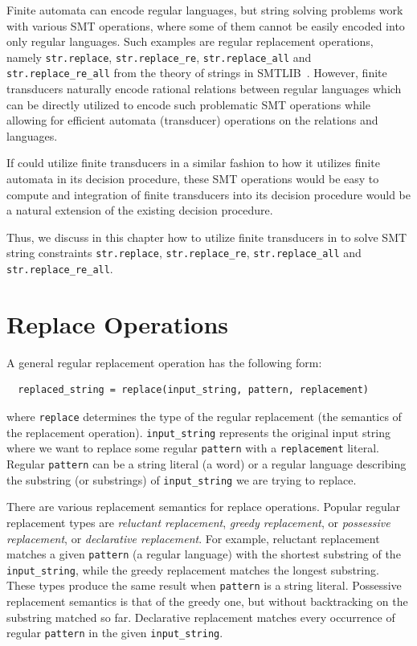 Finite automata can encode regular languages, but string solving problems work with various SMT operations, where some of them cannot be easily encoded into only regular languages.
Such examples are regular replacement operations, namely \texttt{str.replace}, \texttt{str.replace\_re}, \texttt{str.replace\_all} and \texttt{str.replace\_re\_all} from the theory of strings in SMTLIB~\cite{smtlib_theory_strings}.
However, finite transducers naturally encode rational relations between regular languages which can be directly utilized to encode such problematic SMT operations while allowing for efficient automata (transducer) operations on the relations and languages.

If \noodler could utilize finite transducers in a similar fashion to how it utilizes finite automata in its decision procedure, these SMT operations would be easy to compute and integration of finite transducers into its decision procedure would be a natural extension of the existing decision procedure.

Thus, we discuss in this chapter how to utilize finite transducers in \noodler to solve SMT string constraints \texttt{str.replace}, \texttt{str.replace\_re}, \texttt{str.replace\_all} and \texttt{str.replace\_re\_all}.

\section{Replace Operations}
A general regular replacement operation has the following form:
\begin{center}
\begin{verbatim}
  replaced_string = replace(input_string, pattern, replacement)
\end{verbatim}
\end{center}
where \texttt{replace} determines the type of the regular replacement (the semantics of the replacement operation).
\texttt{input\_string} represents the original input string where we want to replace some regular \texttt{pattern} with a \texttt{replacement} literal.
Regular \texttt{pattern} can be a string literal (a word) or a regular language describing the substring (or substrings) of \texttt{input\_string} we are trying to replace.

There are various replacement semantics for replace operations. Popular regular replacement types are \emph{reluctant replacement}, \emph{greedy replacement}, or \emph{possessive replacement}, or \emph{declarative replacement}.
For example, reluctant replacement matches a given \texttt{pattern} (a regular language) with the shortest substring of the \texttt{input\_string}, while the greedy replacement matches the longest substring. These types produce the same result when \texttt{pattern} is a string literal.
Possessive replacement semantics is that of the greedy one, but without backtracking on the substring matched so far.
Declarative replacement matches every occurrence of regular \texttt{pattern} in the given \texttt{input\_string}.

